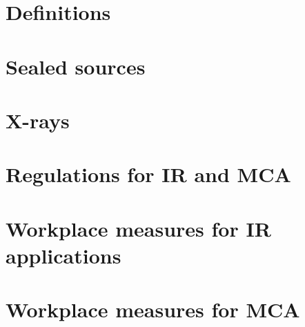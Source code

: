 \section{Definitions}
\section{Sealed sources}
\section{X-rays}
\section{Regulations for IR and MCA}
\section{Workplace measures for IR applications}
\section{Workplace measures for MCA}